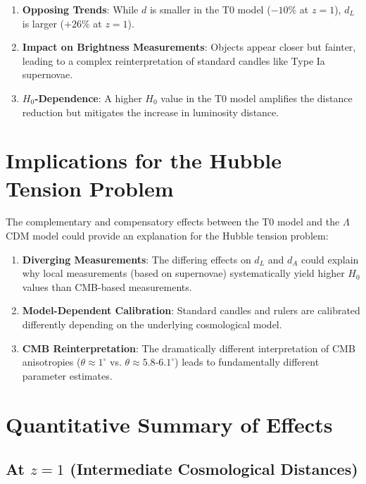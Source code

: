 \documentclass[a4paper,12pt]{article}
\theoremstyle{definition}
\theoremstyle{remark}
\begin{document}
	\begin{enumerate}
		\item \textbf{Opposing Trends}: While $d$ is smaller in the T0 model ($-10\%$ at $z = 1$), $d_L$ is larger ($+26\%$ at $z = 1$).
		
		\item \textbf{Impact on Brightness Measurements}: Objects appear closer but fainter, leading to a complex reinterpretation of standard candles like Type Ia supernovae.
		
		\item \textbf{$H_0$-Dependence}: A higher $H_0$ value in the T0 model amplifies the distance reduction but mitigates the increase in luminosity distance.
	\end{enumerate}
	
	\section{Implications for the Hubble Tension Problem}
	
	The complementary and compensatory effects between the T0 model and the $\Lambda$CDM model could provide an explanation for the Hubble tension problem:
	
	\begin{enumerate}
		\item \textbf{Diverging Measurements}: The differing effects on $d_L$ and $d_A$ could explain why local measurements (based on supernovae) systematically yield higher $H_0$ values than CMB-based measurements.
		
		\item \textbf{Model-Dependent Calibration}: Standard candles and rulers are calibrated differently depending on the underlying cosmological model.
		
		\item \textbf{CMB Reinterpretation}: The dramatically different interpretation of CMB anisotropies ($\theta \approx 1^\circ$ vs. $\theta \approx 5.8$-$6.1^\circ$) leads to fundamentally different parameter estimates.
	\end{enumerate}
	
	\section{Quantitative Summary of Effects}
	
	\subsection{At $z = 1$ (Intermediate Cosmological Distances)}
	
\end{document}
